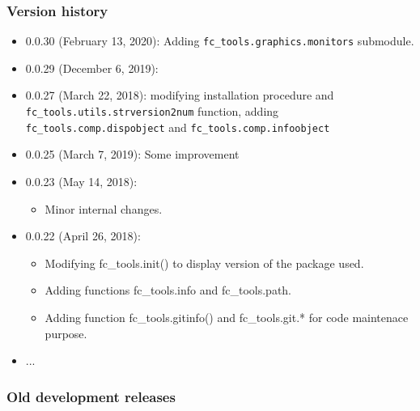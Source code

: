  
\subsubsection{Version history}

\begin{itemize}
\item 0.0.30 (February 13, 2020): Adding \verb+fc_tools.graphics.monitors+ submodule.
\item 0.0.29 (December 6, 2019):
\item 0.0.27 (March 22, 2018): modifying installation procedure and \verb+fc_tools.utils.strversion2num+ function, adding \verb+fc_tools.comp.dispobject+
and \verb+fc_tools.comp.infoobject+
\item 0.0.25 (March 7, 2019): Some improvement
\item 0.0.23 (May 14, 2018):
\begin{itemize}
\item Minor internal changes.
\end{itemize}
\item 0.0.22 (April 26, 2018): 
\begin{itemize}
\item Modifying fc_tools.init() to display version of the package used.
\item Adding functions fc_tools.info and fc_tools.path.
\item Adding function fc_tools.gitinfo() and fc_tools.git.* for code maintenace purpose.
\end{itemize}
\item ...
\end{itemize} 
 
\subsubsection{Old development releases} 

\providecommand\fcInsertVersionOld{}
\renewcommand{\fcInsertVersionOld}[2]{
#1 & #2 & 
\BuildLinkWithSizeInKo{\IHTDIR/distrib/#1/fc-tools-#1.tar.gz}
                  {\OHTDIR/#1/fc-tools-#1.tar.gz}
                  {\texttt{[image: images/icons/Octave\_pkg\_40.gif]}}
& 
\begin{tabular}{l}
\BuildLinkWithSizeInKo{\IHTDIR/distrib/#1/ofc-tools-#1.tar.gz}
                  {\OHTDIR/#1/ofc-tools-#1.tar.gz}
                  {\texttt{[image: images/icons/tar-gz\_40.gif]}}
\\ 
\BuildLinkWithSizeInKo{\IHTDIR/distrib/#1/ofc-tools-#1.zip}
                  {\OHTDIR/#1/ofc-tools-#1.zip}
                  {\texttt{[image: images/icons/zip\_new40.gif]}} 
\\ 
\BuildLinkWithSizeInKo{\IHTDIR/distrib/#1/ofc-tools-#1.7z}
                  {\OHTDIR/#1/ofc-tools-#1.7z}
                  {\texttt{[image: images/icons/7z-icon-40.gif]}}                   
\end{tabular}
&
to do!
}

